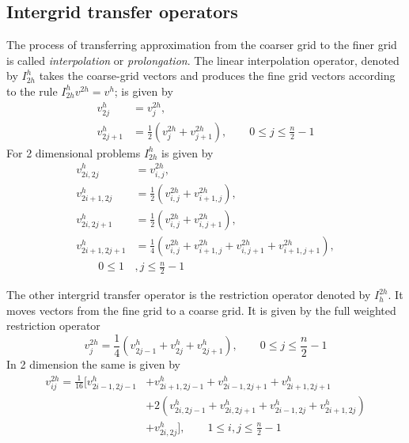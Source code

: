 \documentclass[a4paper]{report}
\begin{document}
	\subsection{Intergrid transfer operators}
	The process of transferring approximation from the coarser grid to the finer grid is called \textit{interpolation} or \textit{prolongation}. The linear interpolation operator, denoted by $I_{2h}^h$ takes the coarse-grid vectors and produces the fine grid vectors according to the rule $I_{2h}^h v^{2h} = v^h$; is given by
	\begin{align*}
	v_{2j}^h &= v_j^{2h},\\
	v_{2j+1}^h &= \frac{1}{2}\left( v^{2h}_j + v^{2h}_{j+1} \right),
	\qquad 0 \leq j \leq \frac{n}{2} - 1
	\end{align*}
	For 2 dimensional problems $I_{2h}^h$ is given by
	\begin{align*}
	v_{2i,2j}^h &= v_{i,j}^{2h},\\
	v_{2i+1,2j}^h &= \frac{1}{2}\left( v^{2h}_{i,j} + v^{2h}_{i+1,j} \right), \\
	v_{2i,2j+1}^h &= \frac{1}{2}\left( v^{2h}_{i,j} + v^{2h}_{i,j+1} \right), \\
	v_{2i+1,2j+1}^h &= \frac{1}{4}\left( v^{2h}_{i,j} + v^{2h}_{i+1,j} + v^{2h}_{i,j+1} + v^{2h}_{i+1,j+1} \right), \\
	\qquad 0 \leq 1&,j \leq \frac{n}{2} - 1
	\end{align*}
	
	The other intergrid transfer operator is the restriction operator denoted by $I^{2h}_h$. It moves vectors from the fine grid to a coarse grid. It is given by the full weighted restriction operator
	\begin{equation}
	v^{2h}_j = \frac{1}{4} \left( v^h_{2j-1} + v^h_{2j} + v^h_{2j+1} \right), \qquad 0 \leq j \leq \frac{n}{2} - 1
	\end{equation}
	In 2 dimension the same is given by
	\begin{align*}
	v^{2h}_{ij} = \frac{1}{16}[
	v^h_{2i-1,2j-1} &+ v^h_{2i+1,2j-1} + v^h_{2i-1,2j+1} + v^h_{2i+1,2j+1} \\
	&+ 2 (v^h_{2i,2j-1} + v^h_{2i,2j+1} + v^h_{2i-1,2j} + v^h_{2i+1,2j} )  \\
	&+ v^h_{2i,2j}
	], \qquad 1 \leq i,j \leq \frac{n}{2}-1
	\end{align*}
	
\end{document}
